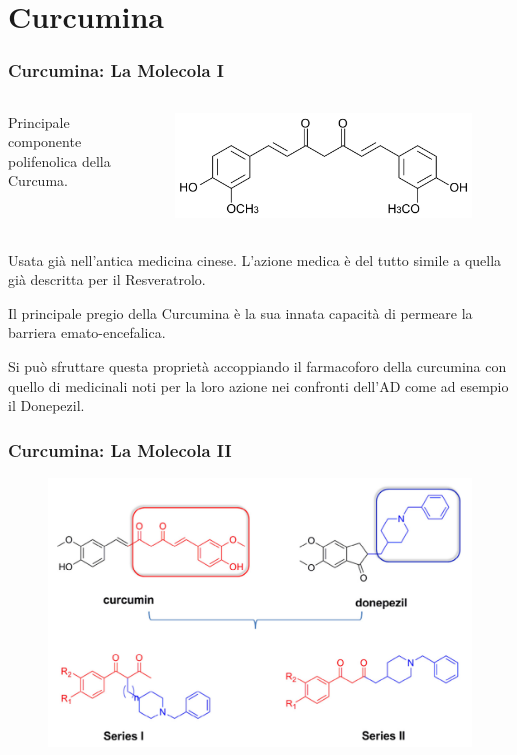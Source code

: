 \documentclass[9pt]{beamer}
\begin{document}
\section{Curcumina}

\begin{frame}
	\frametitle{Curcumina: La Molecola I}
	\begin{columns}
		\begin{column}{.4\textwidth}
			Principale componente polifenolica della Curcuma.
		\end{column}
		\begin{column}{.6\textwidth}
			\begin{figure}
				\includegraphics[width=.8\textwidth]{immagini/curcumina.png}
			\end{figure}
		\end{column}
	\end{columns}
	\bigskip

	Usata già nell'antica medicina cinese. L'azione medica è del tutto simile a quella già descritta per il Resveratrolo.

	Il principale pregio della Curcumina è la sua innata capacità di permeare la barriera emato-encefalica.

	Si può sfruttare questa proprietà accoppiando il farmacoforo della curcumina con quello di medicinali noti per la loro azione nei confronti dell'AD come ad esempio il Donepezil.
\end{frame}

\begin{frame}
	\frametitle{Curcumina: La Molecola II}
	\begin{figure}
		\includegraphics[scale=0.9]{immagini/generale_curcdone.png}
	\end{figure}
\end{frame}
\end{document}

